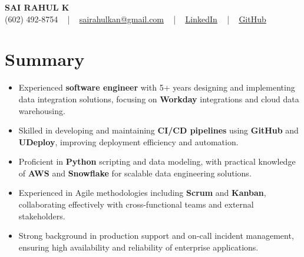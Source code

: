 \documentclass[letterpaper,11pt]{article}
\newcommand{\resumeItem}[1]{
  \item\footnotesize{
    {#1 \vspace{-2pt}}
  }
}
\newcommand{\resumeItemListStart}{\begin{itemize}[leftmargin=*]}
\newcommand{\resumeItemListEnd}{\end{itemize}\vspace{-5pt}}
\begin{document}
\begin{center}
    {\fontsize{14pt}{12pt}\selectfont \textbf{\MakeUppercase{Sai Rahul K}}}\\ \vspace{2pt}
    \fontsize{10pt}{12pt}\selectfont (602) 492-8754 ~ | ~ \href{mailto:sairahulkan@gmail.com}{sairahulkan@gmail.com} ~ | ~
    \href{https://www.linkedin.com/in/rq123/}{\color{blue}\underline{LinkedIn}} ~ | ~
    \href{https://github.com/kanrahuldo}{\color{blue}\underline{GitHub}}~
    \vspace{-8pt}
\end{center}

\section{Summary}
\fontsize{9pt}{10pt}\selectfont
\resumeItemListStart
    \resumeItem{Experienced \textbf{software engineer} with 5+ years designing and implementing data integration solutions, focusing on \textbf{Workday} integrations and cloud data warehousing.}
    \resumeItem{Skilled in developing and maintaining \textbf{CI/CD pipelines} using \textbf{GitHub} and \textbf{UDeploy}, improving deployment efficiency and automation.}
    \resumeItem{Proficient in \textbf{Python} scripting and data modeling, with practical knowledge of \textbf{AWS} and \textbf{Snowflake} for scalable data engineering solutions.}
    \resumeItem{Experienced in Agile methodologies including \textbf{Scrum} and \textbf{Kanban}, collaborating effectively with cross-functional teams and external stakeholders.}
    \resumeItem{Strong background in production support and on-call incident management, ensuring high availability and reliability of enterprise applications.}
\resumeItemListEnd
\vspace{-6pt}
\end{document}
